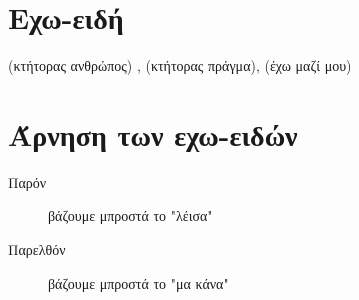 \section*{Εχω-ειδή}

 (κτήτορας ανθρώπος) ,  (κτήτορας πράγμα),  (έχω μαζί μου)

\section*{Άρνηση των εχω-ειδών}

\begin{description}
\item[Παρόν] βάζουμε μπροστά το "λέισα" 
\item[Παρελθόν] βάζουμε μπροστά το "μα κάνα" 
\end{description}
